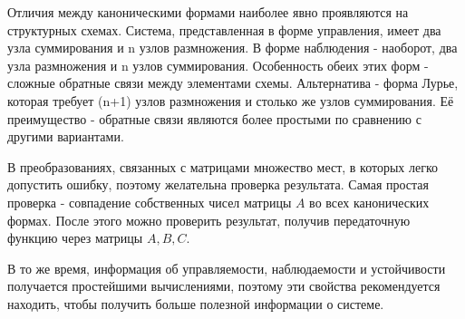 \documentclass[14pt,a4paper,report]{report}
\begin{document}
Отличия между каноническими формами наиболее явно проявляются на структурных схемах. Система, представленная в форме управления, имеет два узла суммирования и n узлов размножения. В форме наблюдения - наоборот, два узла размножения и n узлов суммирования. Особенность обеих этих форм - сложные обратные связи между элементами схемы. Альтернатива - форма Лурье, которая требует (n+1) узлов размножения и столько же узлов суммирования. Её преимущество - обратные связи являются более простыми по сравнению с другими вариантами.

В преобразованиях, связанных с матрицами множество мест, в которых легко допустить ошибку, поэтому желательна проверка результата. Самая простая проверка - совпадение собственных чисел матрицы $A$ во всех канонических формах. После этого можно проверить результат, получив передаточную функцию через матрицы $A,B,C$.

В то же время, информация об управляемости, наблюдаемости и устойчивости получается простейшими вычислениями, поэтому эти свойства рекомендуется находить, чтобы получить больше полезной информации о системе.
\end{document}
